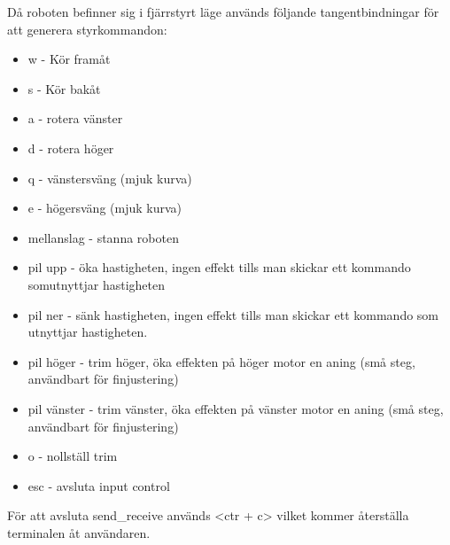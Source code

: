Då roboten befinner sig i fjärrstyrt läge används följande tangentbindningar för
att generera styrkommandon: 
\begin{itemize}
\item w - Kör framåt
\item s - Kör bakåt
\item a - rotera vänster
\item d - rotera höger
\item q - vänstersväng (mjuk kurva)
\item e - högersväng (mjuk kurva)
\item mellanslag - stanna roboten
\item pil upp - öka hastigheten, ingen effekt tills man skickar ett kommando somutnyttjar hastigheten
\item pil ner - sänk hastigheten, ingen effekt tills man skickar ett kommando som utnyttjar hastigheten.
\item pil höger - trim höger, öka effekten på höger motor en aning (små steg, användbart för finjustering)
\item pil vänster - trim vänster, öka effekten på vänster motor en aning (små steg, användbart för finjustering)
\item o - nollställ trim
\item esc - avsluta input control
\end{itemize}

För att avsluta send\_receive används <ctr + c> vilket kommer återställa
terminalen åt användaren.

% 
% 
% 
% 
% 
% 
% 
